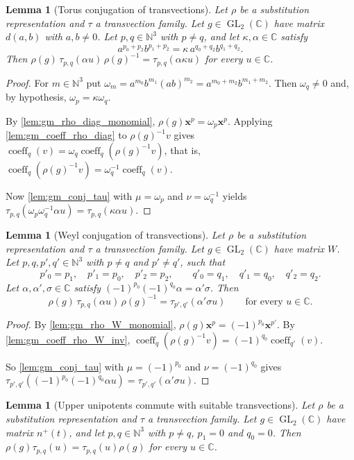 \documentclass[11pt]{article}
\newtheorem{lemma}[theorem]{Lemma}
\theoremstyle{definition}
\theoremstyle{remark}
\newcommand{\CC}{\mathbb{C}}
\newcommand{\NN}{\mathbb{N}}
\DeclareMathOperator{\GL}{GL}
\DeclareMathOperator{\coeff}{coeff}
\begin{document}
\begin{lemma}[Torus conjugation of transvections]\label{lem:gm_conj_diag}
Let $\rho$ be a substitution representation and $\tau$ a transvection family. Let $g\in\GL_2(\CC)$ have matrix $d(a,b)$ with $a,b\neq0$. Let $p,q\in\NN^3$ with $p\ne q$, and let $\kappa,\alpha\in\CC$ satisfy
\[
a^{p_0+p_2}b^{p_1+p_2}=\kappa\,a^{q_0+q_2}b^{q_1+q_2}.
\]
Then $\rho(g)\,\tau_{p,q}(\alpha u)\,\rho(g)^{-1}=\tau_{p,q}(\alpha\kappa u)$ for every $u\in\CC$.
\end{lemma}

\begin{proof}
For $m\in\NN^3$ put $\omega_m=a^{m_0}b^{m_1}(ab)^{m_2}=a^{m_0+m_2}b^{m_1+m_2}$. Then $\omega_q\ne0$ and, by hypothesis, $\omega_p=\kappa\omega_q$.

By \cref{lem:gm_rho_diag_monomial}, $\rho(g)\mathbf x^p=\omega_p\mathbf x^p$. Applying \cref{lem:gm_coeff_rho_diag} to $\rho(g)^{-1}v$ gives $\coeff_q(v)=\omega_q\coeff_q(\rho(g)^{-1}v)$, that is, $\coeff_q(\rho(g)^{-1}v)=\omega_q^{-1}\coeff_q(v)$.

Now \cref{lem:gm_conj_tau} with $\mu=\omega_p$ and $\nu=\omega_q^{-1}$ yields $\tau_{p,q}(\omega_p\omega_q^{-1}\alpha u)=\tau_{p,q}(\kappa\alpha u)$.
\end{proof}

\begin{lemma}[Weyl conjugation of transvections]\label{lem:gm_conj_W}
Let $\rho$ be a substitution representation and $\tau$ a transvection family. Let $g\in\GL_2(\CC)$ have matrix $W$. Let $p,q,p',q'\in\NN^3$ with $p\ne q$ and $p'\neq q'$, such that
\[
p'_0=p_1,\quad p'_1=p_0,\quad p'_2=p_2,\qquad q'_0=q_1,\quad q'_1=q_0,\quad q'_2=q_2 .
\]
Let $\alpha,\alpha',\sigma\in\CC$ satisfy $(-1)^{p_0}(-1)^{q_0}\alpha=\alpha'\sigma$. Then
\[
\rho(g)\,\tau_{p,q}(\alpha u)\,\rho(g)^{-1}=\tau_{p',q'}(\alpha'\sigma u)\qquad\text{for every } u\in\CC .
\]
\end{lemma}

\begin{proof}
By \cref{lem:gm_rho_W_monomial}, $\rho(g)\mathbf x^p=(-1)^{p_0}\mathbf x^{p'}$. By \cref{lem:gm_coeff_rho_W_inv}, $\coeff_q(\rho(g)^{-1}v)=(-1)^{q_0}\coeff_{q'}(v)$.

So \cref{lem:gm_conj_tau} with $\mu=(-1)^{p_0}$ and $\nu=(-1)^{q_0}$ gives $\tau_{p',q'}((-1)^{p_0}(-1)^{q_0}\alpha u)=\tau_{p',q'}(\alpha'\sigma u)$.
\end{proof}

\begin{lemma}[Upper unipotents commute with suitable transvections]\label{lem:gm_comm_ux}
Let $\rho$ be a substitution representation and $\tau$ a transvection family. Let $g\in\GL_2(\CC)$ have matrix $n^+(t)$, and let $p,q\in\NN^3$ with $p\neq q$, $p_1=0$ and $q_0=0$. Then $\rho(g)\tau_{p,q}(u)=\tau_{p,q}(u)\rho(g)$ for every $u\in\CC$.
\end{lemma}
\end{document}

